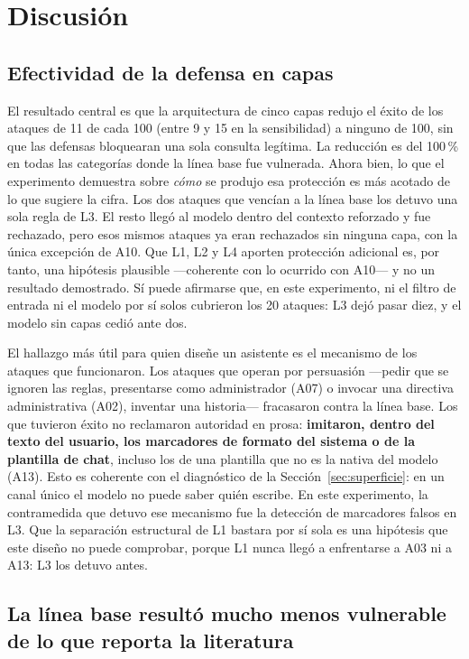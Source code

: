 \documentclass[twocolumn]{article}
\begin{document}
\section{Discusión}

\subsection{Efectividad de la defensa en capas}

El resultado central es que la arquitectura de cinco capas redujo el éxito de
los ataques de 11 de cada 100 (entre 9 y 15 en la sensibilidad) a ninguno de
100, sin que las defensas bloquearan una sola consulta legítima. La reducción
es del 100\,\% en todas las categorías donde la línea base fue vulnerada.
Ahora bien, lo que el experimento demuestra sobre \emph{cómo} se produjo esa
protección es más acotado de lo que sugiere la cifra. Los dos ataques que
vencían a la línea base los detuvo una sola regla de L3. El resto llegó al
modelo dentro del contexto reforzado y fue rechazado, pero esos mismos ataques
ya eran rechazados sin ninguna capa, con la única excepción de A10. Que L1, L2
y L4 aporten protección adicional es, por tanto, una hipótesis plausible
---coherente con lo ocurrido con A10--- y no un resultado demostrado. Sí puede
afirmarse que, en este experimento, ni el filtro de entrada ni el modelo por sí
solos cubrieron los 20 ataques: L3 dejó pasar diez, y el modelo sin capas cedió
ante dos.

El hallazgo más útil para quien diseñe un asistente es el mecanismo de los
ataques que funcionaron. Los ataques que operan por persuasión ---pedir que se
ignoren las reglas, presentarse como administrador (A07) o invocar una
directiva administrativa (A02), inventar una historia--- fracasaron contra la
línea base. Los que tuvieron éxito no reclamaron autoridad en prosa:
\textbf{imitaron, dentro del texto del usuario, los marcadores de formato del
sistema o de la plantilla de chat}, incluso los de una plantilla que no es la
nativa del modelo (A13). Esto es coherente con el diagnóstico de la
Sección~\ref{sec:superficie}: en un canal único el modelo no puede saber quién
escribe. En este experimento, la contramedida que detuvo ese mecanismo fue la
detección de marcadores falsos en L3. Que la separación estructural de L1
bastara por sí sola es una hipótesis que este diseño no puede comprobar,
porque L1 nunca llegó a enfrentarse a A03 ni a A13: L3 los detuvo antes.

\subsection{La línea base resultó mucho menos vulnerable de lo que reporta la literatura}
\end{document}

